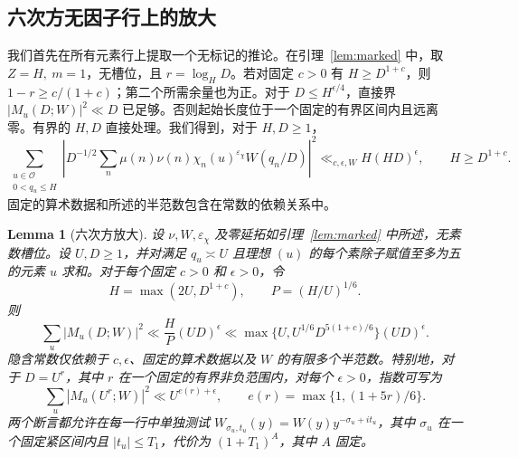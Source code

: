 \documentclass[11pt,a4paper]{article}
\numberwithin{equation}{section}
\numberwithin{figure}{section}
\newtheorem{lemma}[theorem]{Lemma}
\theoremstyle{definition}
\theoremstyle{remark}
\begin{document}
\subsection{六次方无因子行上的放大}

我们首先在所有元素行上提取一个无标记的推论。在引理~\ref{lem:marked} 中，取 \(Z=H,\ m=1\)，无槽位，且 \(r=\log_H D\)。若对固定 \(c>0\) 有 \(H\ge D^{1+c}\)，则 \(1-r\ge c/(1+c)\)；第二个所需余量也为正。对于 \(D\le H^{\epsilon/4}\)，直接界 \(|M_u(D;W)|^2\ll D\) 已足够。否则起始长度位于一个固定的有界区间内且远离零。有界的 \(H,D\) 直接处理。我们得到，对于 \(H,D\ge1\)，
\begin{equation}\label{eq:raw-moment}
 \sum_{\substack{u\in\mathcal O\\0<q_u\le H}}
 \left|D^{-1/2}\sum_n\mu(n)\nu(n)\chi_n(u)^{\varepsilon_\chi}
                         W(q_n/D)\right|^2
 \ll_{c,\epsilon,W} H(HD)^\epsilon,\qquad H\ge D^{1+c}.
\end{equation}
固定的算术数据和所述的半范数包含在常数的依赖关系中。

\begin{lemma}[六次方放大]\label{lem:inverse-amplification}
设 \(\nu,W,\varepsilon_\chi\) 及零延拓如引理~\ref{lem:marked} 中所述，无素数槽位。设 \(U,D\ge1\)，并对满足 \(q_u\asymp U\) 且理想 \((u)\) 的每个素除子赋值至多为五的元素 \(u\) 求和。对于每个固定 \(c>0\) 和 \(\epsilon>0\)，令
\[
 H=\max(2U,D^{1+c}),\qquad P=(H/U)^{1/6}.
\]
则
\begin{equation}\label{eq:amplified-note}
 \sum_u|M_u(D;W)|^2
 \ll \frac HP(UD)^\epsilon
 \ll \max\{U,U^{1/6}D^{5(1+c)/6}\}(UD)^\epsilon.
\end{equation}
隐含常数仅依赖于 \(c,\epsilon\)、固定的算术数据以及 \(W\) 的有限多个半范数。特别地，对于 \(D=U^r\)，其中 \(r\) 在一个固定的有界非负范围内，对每个 \(\epsilon>0\)，指数可写为
\[
 \sum_u|M_u(U^r;W)|^2\ll U^{e(r)+\epsilon},
 \qquad e(r)=\max\{1,(1+5r)/6\}.
\]
两个断言都允许在每一行中单独测试 \(W_{\sigma_u,t_u}(y)=W(y)y^{-\sigma_u+it_u}\)，其中 \(\sigma_u\) 在一个固定紧区间内且 \(|t_u|\le T_1\)，代价为 \((1+T_1)^A\)，其中 \(A\) 固定。
\end{lemma}
\end{document}
